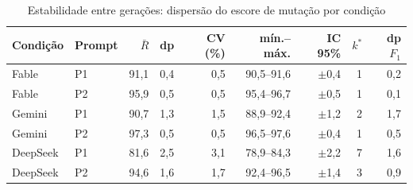 \begin{table}[htb]
    \centering
    \ABNTEXfontereduzida
    \begin{minipage}{\textwidth}
        \caption{Estabilidade entre gerações: dispersão do escore de mutação por condição}
        \label{tab:estabilidade}
        \centering\scriptsize\setlength{\tabcolsep}{3pt}
        \begin{tabular}{ll rrr r r r r}
            \toprule
            \textbf{Condição} & \textbf{Prompt} & $\bar{R}$ & dp & CV (\%) & mín.--máx. & IC 95\% & $k^*$ & dp $F_1$ \\
            \midrule
            Fable & P1 & 91,1 & 0,4 & 0,5 & 90,5--91,6 & $\pm$0,4 & 1 & 0,2 \\
            Fable & P2 & 95,9 & 0,5 & 0,5 & 95,4--96,7 & $\pm$0,5 & 1 & 0,1 \\
            Gemini & P1 & 90,7 & 1,3 & 1,5 & 88,9--92,4 & $\pm$1,2 & 2 & 1,7 \\
            Gemini & P2 & 97,3 & 0,5 & 0,5 & 96,5--97,6 & $\pm$0,4 & 1 & 0,5 \\
            DeepSeek & P1 & 81,6 & 2,5 & 3,1 & 78,9--84,3 & $\pm$2,2 & 7 & 1,6 \\
            DeepSeek & P2 & 94,6 & 1,6 & 1,7 & 92,4--96,5 & $\pm$1,4 & 3 & 0,9 \\
            \bottomrule
        \end{tabular}
    \end{minipage}
\end{table}
